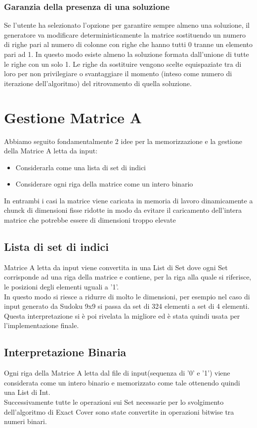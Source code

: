 \subsubsection{Garanzia della presenza di una soluzione}
Se l’utente ha selezionato l’opzione per garantire sempre almeno una soluzione, il generatore va modificare deterministicamente la matrice sostituendo un numero di righe pari al numero di colonne con righe che hanno tutti 0 tranne un elemento pari ad 1. In questo modo esiste almeno la soluzione formata dall’unione di tutte le righe con un solo 1. Le righe da sostituire vengono scelte equispaziate tra di loro per non privilegiare o svantaggiare il momento (inteso come numero di iterazione dell’algoritmo) del ritrovamento di quella soluzione.


\section{Gestione Matrice A}
Abbiamo seguito fondamentalmente 2 idee per la memorizzazione e la gestione della Matrice A letta da input:
\begin{itemize}
    \item Considerarla come una lista di set di indici
    \item Considerare ogni riga della matrice come un intero binario
\end{itemize}
In entrambi i casi la matrice viene caricata in memoria di lavoro dinamicamente a chunck di dimensioni fisse ridotte in modo da evitare il caricamento dell'intera matrice che potrebbe essere di dimensioni troppo elevate

\subsection{Lista di set di indici}
Matrice A letta da input viene convertita in una List di Set dove ogni Set corrisponde ad una riga della matrice e contiene, per la riga alla quale si riferisce, le posizioni degli elementi uguali a '1'.\\
In questo modo si riesce a ridurre di molto le dimensioni, per esempio nel caso di input generato da Sudoku 9x9 si passa da set di 324 elementi a set di 4 elementi.\\
Questa interpretazione si è poi rivelata la migliore ed è stata quindi usata per l'implementazione finale.

\subsection{Interpretazione Binaria}
Ogni riga della Matrice A letta dal file di input(sequenza di '0' e '1') viene considerata come un intero binario e memorizzato come tale ottenendo quindi una List di Int.\\
Successivamente tutte le operazioni sui Set necessarie per lo svolgimento dell'algoritmo di Exact Cover sono state convertite in operazioni bitwise tra numeri binari.

